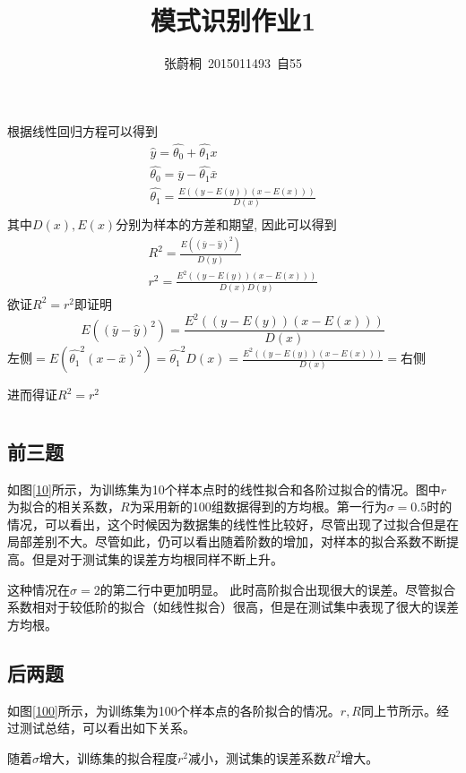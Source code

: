 \documentclass[UTF8,a4paper]{ctexart}
\title{模式识别作业1}
\author{张蔚桐\ 2015011493\ 自55}
\begin{document}
\maketitle
\section{}
根据线性回归方程可以得到$$\begin{aligned}
\hat{y}=\hat{\theta_0}+\hat{\theta_1}x \\ 
\hat{\theta_0}=\bar{y}-\hat{\theta_1}\bar{x} \\
\hat{\theta_1}=\frac{E((y-E(y))(x-E(x)))}{D(x)}\\
\end{aligned}$$其中$D(x),E(x)$分别为样本的方差和期望,
因此可以得到$$\begin{aligned}
R^2=\frac{E((\bar{y}-\hat{y})^2)}{D(y)} \\
r^2=\frac{E^2((y-E(y))(x-E(x)))}{D(x)D(y)} \end{aligned} $$
欲证$R^2=r^2$即证明$$E((\bar{y}-\hat{y})^2)=\frac{E^2((y-E(y))(x-E(x)))}{D(x)}$$
左侧$=E(\hat{\theta_1}^2(x-\bar{x})^2)=\hat{\theta_1}^2D(x)=\frac{E^2((y-E(y))(x-E(x)))}{D(x)}=$右侧

进而得证$R^2=r^2$
\section{}
\subsection{前三题}
如图\ref{10}所示，为训练集为10个样本点时的线性拟合和各阶过拟合的情况。图中$r$为拟合的相关系数，$R$为采用新的100组数据得到的方均根。第一行为$\sigma = 0.5$时的情况，可以看出，这个时候因为数据集的线性性比较好，尽管出现了过拟合但是在局部差别不大。尽管如此，仍可以看出随着阶数的增加，对样本的拟合系数不断提高。但是对于测试集的误差方均根同样不断上升。

这种情况在$\sigma = 2$的第二行中更加明显。 此时高阶拟合出现很大的误差。尽管拟合系数相对于较低阶的拟合（如线性拟合）很高，但是在测试集中表现了很大的误差方均根。
\subsection{后两题}
如图\ref{100}所示，为训练集为100个样本点的各阶拟合的情况。$r,R$同上节所示。经过测试总结，可以看出如下关系。

随着$\sigma$增大，训练集的拟合程度$r^2$减小，测试集的误差系数$R^2$增大。
\end{document}
